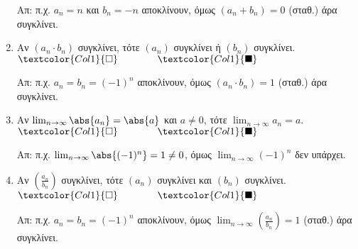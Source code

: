 \documentclass[a4paper,table]{report}
\begin{document}
\begin{enumerate}[itemsep=.5\baselineskip]
    Απ: π.χ. $ a_{n}= n $ και $ b_{n}=-n $ αποκλίνουν, όμως $ (a_{n}+b_{n})=0 $ 
    (σταθ.) άρα συγκλίνει.

  \item \textcolor{Col1}{Αν $ (a_{n}\cdot b_{n}) $ συγκλίνει, τότε $ (a_{n}) $ 
      συγκλίνει ή $ (b_{n}) $ συγκλίνει}.
    \hfill $\textcolor{Col1}{\square} \qquad \qquad \textcolor{Col1}{\blacksquare}$

    Απ: π.χ. $ a_{n}=b_{n}=(-1)^{n} $ αποκλίνουν, όμως $ (a_{n}\cdot
    b_{n})=1 $ (σταθ.) άρα συγκλίνει. 

  \item \textcolor{Col1}{Αν $ \lim_{n \to \infty} \abs{a_{n}} = \abs{a} $ και 
      $ a \neq 0 $, τότε $ \lim_{n \to \infty} a_{n} = a $}.
    \hfill $\textcolor{Col1}{\square} \qquad \qquad \textcolor{Col1}{\blacksquare}$

    Απ: π.χ. $ \lim_{n \to \infty} \abs{(-1)^{n}} = 1 \neq 0 $, όμως 
    $ \lim_{n \to \infty} (-1)^{n} $ δεν υπάρχει.

  \item \textcolor{Col1}{Αν $ \left(\frac{a_{n}}{b_{n}}\right) $ συγκλίνει, τότε 
      $ (a_{n}) $ συγκλίνει και $ (b_{n}) $ συγκλίνει}.
    \hfill $\textcolor{Col1}{\square} \qquad \qquad \textcolor{Col1}{\blacksquare}$

    Απ: π.χ. $ a_{n}=b_{n}=(-1)^{n} $ αποκλίνουν, όμως $ \lim_{n
    \to \infty} (\frac{a_{n}}{b_{n}})=1 $ (σταθ.) άρα συγκλίνει. 
\end{enumerate}
\end{document}
